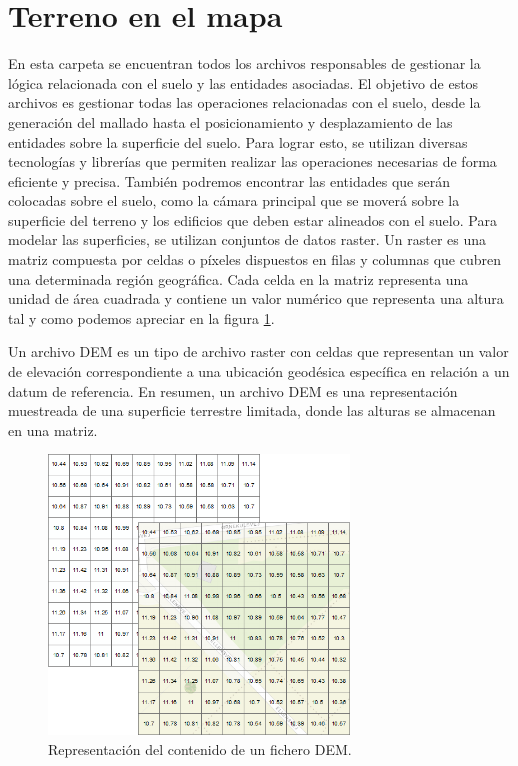 \documentclass[a4paper, 11pt]{book}
\begin{document}
\section{Terreno en el mapa}
\label{sec:mapGround}
En esta carpeta se encuentran todos los archivos responsables de gestionar la lógica relacionada con el suelo y las entidades asociadas. El objetivo de estos archivos es gestionar todas las operaciones relacionadas con el suelo, desde la generación del mallado hasta el posicionamiento y desplazamiento de las entidades sobre la superficie del suelo. Para lograr esto, se utilizan diversas tecnologías y librerías que permiten realizar las operaciones necesarias de forma eficiente y precisa.
También podremos encontrar las entidades que serán colocadas sobre el suelo, como la cámara principal que se moverá sobre la superficie del terreno y los edificios que deben estar alineados con el suelo. Para modelar las superficies, se utilizan conjuntos de datos raster. Un raster es una matriz compuesta por celdas o píxeles dispuestos en filas y columnas que cubren una determinada región geográfica.
Cada celda en la matriz representa una unidad de área cuadrada y contiene un valor numérico que representa una altura tal y como podemos apreciar en la figura \ref{fig:dem}.

Un archivo DEM es un tipo de archivo raster con celdas que representan un valor de elevación correspondiente a una ubicación geodésica específica en relación a un datum de referencia. En resumen, un archivo DEM es una representación muestreada de una superficie terrestre limitada, donde las alturas se almacenan en una matriz.

\begin{figure}[H]
  \centering
  \includegraphics[width=8cm, keepaspectratio]{img/dem.png}
  \caption{Representación del contenido de un fichero DEM.}
  \label{fig:dem}
\end{figure}
\end{document}
